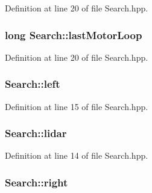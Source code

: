 Definition at line 20 of file Search.\-hpp.

\hypertarget{classSearch_af73bd725381f47afa3bf6af64d39f3b6}{
\subsubsection[{last\-Motor\-Loop}]{\setlength{\rightskip}{0pt plus 5cm}long Search\-::last\-Motor\-Loop\hspace{0.3cm}{\ttfamily [private]}}}\label{classSearch_af73bd725381f47afa3bf6af64d39f3b6}


Definition at line 20 of file Search.\-hpp.

\hypertarget{classSearch_ad1df1ee1c5afbeb2767a4c1e064e7318}{
\subsubsection[{left}]{ Search\-::left\hspace{0.3cm}{\ttfamily [private]}}}\label{classSearch_ad1df1ee1c5afbeb2767a4c1e064e7318}


Definition at line 15 of file Search.\-hpp.

\hypertarget{classSearch_ad1209571d5e6cb4c53494549d8ec4ac6}{
\subsubsection[{lidar}]{ Search\-::lidar\hspace{0.3cm}{\ttfamily [private]}}}\label{classSearch_ad1209571d5e6cb4c53494549d8ec4ac6}


Definition at line 14 of file Search.\-hpp.

\hypertarget{classSearch_a7f0e23cc5c8aa635fbe7f5b4c8e30eb0}{
\subsubsection[{right}]{ Search\-::right\hspace{0.3cm}{\ttfamily [private]}}}\label{classSearch_a7f0e23cc5c8aa635fbe7f5b4c8e30eb0}


